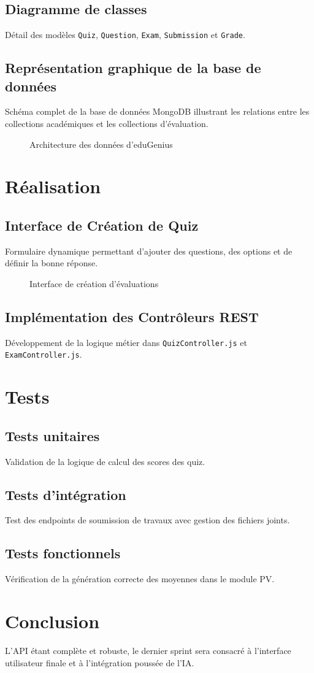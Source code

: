 \subsection{Diagramme de classes}
Détail des modèles \texttt{Quiz}, \texttt{Question}, \texttt{Exam}, \texttt{Submission} et \texttt{Grade}.

\subsection{Représentation graphique de la base de données}
Schéma complet de la base de données MongoDB illustrant les relations entre les collections académiques et les collections d'évaluation.
\begin{figure}[H]
    \centering
    \caption{Architecture des données d'eduGenius}
\end{figure}

\section{Réalisation}
\subsection{Interface de Création de Quiz}
Formulaire dynamique permettant d'ajouter des questions, des options et de définir la bonne réponse.
\begin{figure}[H]
    \centering
    \caption{Interface de création d'évaluations}
\end{figure}

\subsection{Implémentation des Contrôleurs REST}
Développement de la logique métier dans \texttt{QuizController.js} et \texttt{ExamController.js}.

\section{Tests}
\subsection{Tests unitaires}
Validation de la logique de calcul des scores des quiz.
\subsection{Tests d'intégration}
Test des endpoints de soumission de travaux avec gestion des fichiers joints.
\subsection{Tests fonctionnels}
Vérification de la génération correcte des moyennes dans le module PV.

\section{Conclusion}
L'API étant complète et robuste, le dernier sprint sera consacré à l'interface utilisateur finale et à l'intégration poussée de l'IA.
